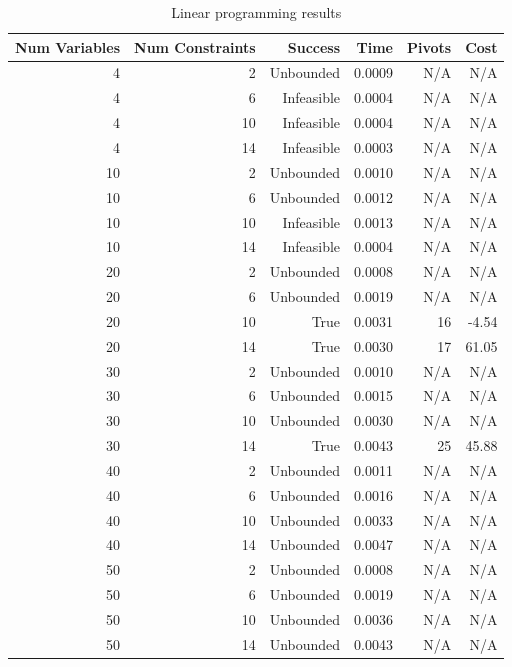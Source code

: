 \begin{table}[ht]
    \centering
    \begin{tabular}{rrrrrr}
        \toprule
        Num Variables & Num Constraints & Success & Time & Pivots & Cost \\
        \midrule
        4 & 2 & Unbounded & 0.0009 & N/A & N/A \\
		4 & 6 & Infeasible & 0.0004 & N/A & N/A \\
		4 & 10 & Infeasible & 0.0004 & N/A & N/A \\
		4 & 14 & Infeasible & 0.0003 & N/A & N/A \\
		10 & 2 & Unbounded & 0.0010 & N/A & N/A \\
		10 & 6 & Unbounded & 0.0012 & N/A & N/A \\
		10 & 10 & Infeasible & 0.0013 & N/A & N/A \\
		10 & 14 & Infeasible & 0.0004 & N/A & N/A \\
		20 & 2 & Unbounded & 0.0008 & N/A & N/A \\
		20 & 6 & Unbounded & 0.0019 & N/A & N/A \\
		20 & 10 & True & 0.0031 & 16 & -4.54 \\
		20 & 14 & True & 0.0030 & 17 & 61.05 \\
		30 & 2 & Unbounded & 0.0010 & N/A & N/A \\
		30 & 6 & Unbounded & 0.0015 & N/A & N/A \\
		30 & 10 & Unbounded & 0.0030 & N/A & N/A \\
		30 & 14 & True & 0.0043 & 25 & 45.88 \\
		40 & 2 & Unbounded & 0.0011 & N/A & N/A \\
		40 & 6 & Unbounded & 0.0016 & N/A & N/A \\
		40 & 10 & Unbounded & 0.0033 & N/A & N/A \\
		40 & 14 & Unbounded & 0.0047 & N/A & N/A \\
		50 & 2 & Unbounded & 0.0008 & N/A & N/A \\
		50 & 6 & Unbounded & 0.0019 & N/A & N/A \\
		50 & 10 & Unbounded & 0.0036 & N/A & N/A \\
		50 & 14 & Unbounded & 0.0043 & N/A & N/A \\
        \bottomrule
    \end{tabular}
    \caption{Linear programming results}
    \label{tab:lp-results}
\end{table}
